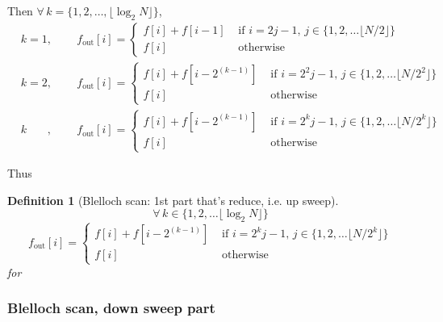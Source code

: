 \documentclass[10pt]{amsart}
\newtheorem{definition}{Definition}
\begin{document}
\begin{multicols*}{2}
Then $\forall \, k = \lbrace 1, 2, \dots , \lfloor \log_2{ N} \rfloor \rbrace$,
\[
\begin{aligned}
  & k =1 , \qquad \, f_{\text{out}}[i] = \begin{cases} f[i] + f[i-1] & \text{ if } i = 2j - 1 , \, j \in \lbrace 1,2, \dots \lfloor N/2 \rfloor \rbrace \\
    f[i] & \text{ otherwise } \end{cases} \\
    & k =2 , \qquad \, f_{\text{out}}[i] = \begin{cases} f[i] + f[i-2^{(k-1)}] & \text{ if } i = 2^2j - 1 , \, j \in \lbrace 1,2, \dots \lfloor N/2^2 \rfloor \rbrace \\
    f[i] & \text{ otherwise } \end{cases} \\ 
  & k \phantom{=1}  , \qquad \, f_{\text{out}}[i] = \begin{cases} f[i] + f[i-2^{(k-1)}] & \text{ if } i = 2^kj - 1 , \, j \in \lbrace 1,2, \dots \lfloor N/2^k \rfloor \rbrace \\
    f[i] & \text{ otherwise } \end{cases}
\end{aligned}
\]

Thus
\begin{definition}[Blelloch scan: 1st part that's reduce, i.e. up sweep]
  \[
\forall \, k \in \lbrace 1, 2, \dots \lfloor \log_2{N} \rfloor \rbrace
\]
\begin{equation}
  f_{\text{out}}[i] = \begin{cases} f[i] + f[i-2^{(k-1)}] & \text{ if } i = 2^kj - 1 , \, j \in \lbrace 1,2, \dots \lfloor N/2^k \rfloor \rbrace \\
    f[i] & \text{ otherwise } \end{cases}
  \end{equation}
for
  \end{definition}

\subsubsection{Blelloch scan, down sweep part}


\end{multicols*}
\end{document}

